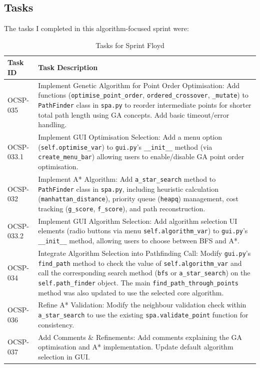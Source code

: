 \subsection{Tasks}

The tasks I completed in this algorithm-focused sprint were:
\begin{table}[htbp]
	\centering
	\begin{tabularx}{\textwidth}{|l|X|}
		\hline
		\textbf{Task ID} & \textbf{Task Description} \\
		\hline
		OCSP-035 & Implement Genetic Algorithm for Point Order Optimisation: Add functions (\verb|optimise_point_order|, \verb|ordered_crossover|, \verb|_mutate|) to \verb|PathFinder| class in \verb|spa.py| to reorder intermediate points for shorter total path length using GA concepts. Add basic timeout/error handling. \\
		\hline
		OCSP-033.1 & Implement GUI Optimisation Selection: Add a menu option (\verb|self.optimise_var|) to \verb|gui.py|'s \verb|__init__| method (via \verb|create_menu_bar|) allowing users to enable/disable GA point order optimisation. \\
		\hline
		OCSP-032 & Implement A* Algorithm: Add \verb|a_star_search| method to \verb|PathFinder| class in \verb|spa.py|, including heuristic calculation (\verb|manhattan_distance|), priority queue (\verb|heapq|) management, cost tracking (\verb|g_score|, \verb|f_score|), and path reconstruction. \\
		\hline
		OCSP-033.2 & Implement GUI Algorithm Selection: Add algorithm selection UI elements (radio buttons via menu \verb|self.algorithm_var|) to \verb|gui.py|'s \verb|__init__| method, allowing users to choose between BFS and A*. \\
		\hline
		OCSP-034 & Integrate Algorithm Selection into Pathfinding Call: Modify \verb|gui.py|'s \verb|find_path| method to check the value of \verb|self.algorithm_var| and call the corresponding search method (\verb|bfs| or \verb|a_star_search|) on the \verb|self.path_finder| object. The main \verb|find_path_through_points| method was also updated to use the selected core algorithm. \\
		\hline
		OCSP-036 & Refine A* Validation: Modify the neighbour validation check within \verb|a_star_search| to use the existing \verb|spa.validate_point| function for consistency. \\
		\hline
		OCSP-037 & Add Comments \& Refinements: Add comments explaining the GA optimisation and A* implementation. Update default algorithm selection in GUI. \\
		\hline
	\end{tabularx}
	\caption{Tasks for Sprint Floyd}
\end{table}

